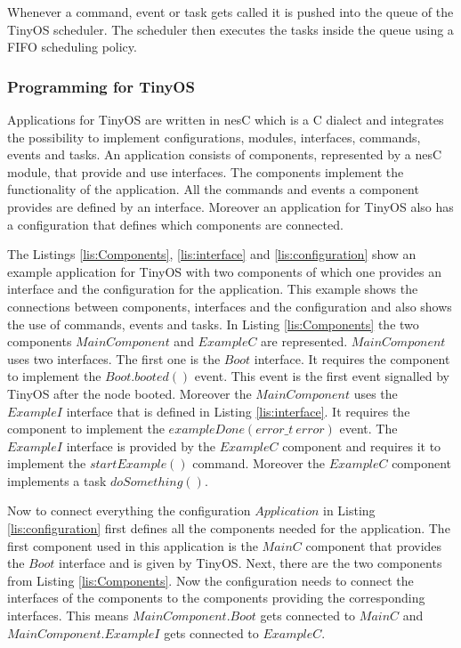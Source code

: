 Whenever a command, event or task gets called it is pushed into the queue of the TinyOS scheduler. The scheduler then executes the tasks inside the queue using a FIFO scheduling policy. \cite{Tinyos}     

\subsubsection{Programming for TinyOS}
Applications for TinyOS are written in nesC which is a C dialect and integrates the possibility to implement configurations, modules, interfaces, commands, events and tasks. An application consists of components, represented by a nesC module, that provide and use interfaces. The components implement the functionality of the application. All the commands and events a component provides are defined by an interface. Moreover an application for TinyOS also has a configuration that defines which components are connected.   

The Listings \ref{lis:Components}, \ref{lis:interface} and \ref{lis:configuration} show an example application for TinyOS with two components of which one provides an interface and the configuration for the application. This example shows the connections between components, interfaces and the configuration and also shows the use of commands, events and tasks. In Listing \ref{lis:Components} the two components $MainComponent$ and $ExampleC$ are represented. $MainComponent$ uses two interfaces. The first one is the $Boot$ interface. It requires the component to implement the $Boot.booted()$ event. This event is the first event signalled by TinyOS after the node booted. Moreover the $MainComponent$ uses the $ExampleI$ interface that is defined in Listing \ref{lis:interface}. It requires the component to implement the $exampleDone(error\_t\ error)$ event. The $ExampleI$ interface is provided by the $ExampleC$ component and requires it to implement the $startExample()$ command. Moreover the $ExampleC$ component implements a task $doSomething()$.

Now to connect everything the configuration $Application$ in Listing \ref{lis:configuration} first defines all the components needed for the application. The first component used in this application is the $MainC$ component that provides the $Boot$ interface and is given by TinyOS. Next, there are the two components from Listing \ref{lis:Components}. Now the configuration needs to connect the interfaces of the components to the components providing the corresponding interfaces. This means $MainComponent.Boot$ gets connected to $MainC$ and $MainComponent.ExampleI$ gets connected to $ExampleC$.

